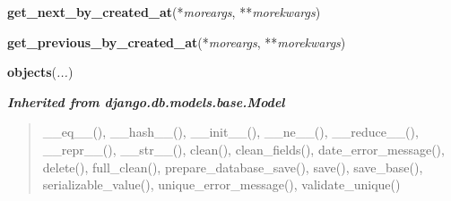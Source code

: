     \vspace{0.5ex}

\hspace{.8\funcindent}\begin{boxedminipage}{\funcwidth}

    \raggedright \textbf{get\_next\_by\_created\_at}(*\textit{moreargs}, **\textit{morekwargs})

\setlength{\parskip}{2ex}
\setlength{\parskip}{1ex}
    \end{boxedminipage}

    \label{spatio_main:models:WlanHotspot:get_previous_by_created_at}

    \vspace{0.5ex}

\hspace{.8\funcindent}\begin{boxedminipage}{\funcwidth}

    \raggedright \textbf{get\_previous\_by\_created\_at}(*\textit{moreargs}, **\textit{morekwargs})

\setlength{\parskip}{2ex}
\setlength{\parskip}{1ex}
    \end{boxedminipage}

    \label{spatio_main:models:WlanHotspot:objects}

    \vspace{0.5ex}

\hspace{.8\funcindent}\begin{boxedminipage}{\funcwidth}

    \raggedright \textbf{objects}(\textit{...})

\setlength{\parskip}{2ex}
\setlength{\parskip}{1ex}
    \end{boxedminipage}


\large{\textbf{\textit{Inherited from django.db.models.base.Model}}}

\begin{quote}
\_\_eq\_\_(), \_\_hash\_\_(), \_\_init\_\_(), \_\_ne\_\_(), \_\_reduce\_\_(), \_\_repr\_\_(), \_\_str\_\_(), clean(), clean\_fields(), date\_error\_message(), delete(), full\_clean(), prepare\_database\_save(), save(), save\_base(), serializable\_value(), unique\_error\_message(), validate\_unique()
\end{quote}

